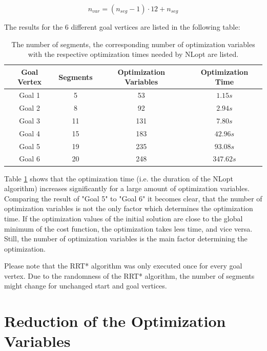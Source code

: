 \begin{equation}
n_{var} = (n_{seg} - 1)\cdot 12 + n_{seg}
\label{equ:numberOfSeg}
\end{equation}

The results for the 6 different goal vertices are listed in the following table:


\begin{table}[H] 
\begin{center}
    \begin{tabular}{| c | c | c | c | }
    \hline
    Goal Vertex & Segments & Optimization Variables & Optimization Time\\ \hline
   Goal 1 & 5 & 53 & $1.15s$\\ \hline
  Goal 2 & 8 & 92 & $2.94s$\\ \hline
   Goal 3 & 11 & 131 & $7.80s$\\ \hline
Goal 4 & 15 & 183& $42.96s$\\ \hline
Goal 5 & 19 & 235& $93.08s$\\ \hline
   Goal 6& 20 & 248 & $347.62s$\\
    \hline
    \end{tabular}
    \caption{The number of segments, the corresponding number of optimization variables with the respective optimization times needed by NLopt are listed.}
    \label{tab:MLoptimizationTime}
\end{center}
\end{table}

Table \ref{tab:MLoptimizationTime} shows that the optimization time (i.e. the duration of the NLopt algorithm) increases significantly for a large amount of optimization variables. Comparing the result of "Goal 5" to "Goal 6" it becomes clear, that the number of optimization variables is not the only factor which determines the optimization time. If the optimization values of the initial solution are close to the global minimum of the cost function, the optimization takes less time, and vice versa. Still, the number of optimization variables is the main factor determining the optimization. \newline

Please note that the RRT* algorithm was only executed once for every goal vertex. Due to the randomness of the RRT* algorithm, the number of segments might change for unchanged start and goal vertices.

\section{Reduction of the Optimization Variables}

